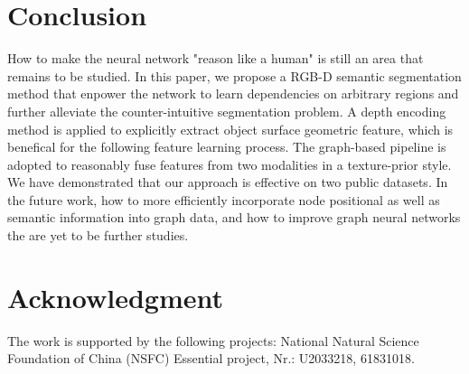 \documentclass[journal]{IEEEtran}
\begin{document}
\section{Conclusion}
    How to make the neural network "reason like a human" is still an area that remains to be studied. In this paper, we propose a RGB-D semantic segmentation method that enpower the network to learn dependencies on arbitrary regions and further alleviate the counter-intuitive segmentation problem. A depth encoding method is applied to explicitly extract object surface geometric feature, which is benefical for the following feature learning process. The graph-based pipeline is adopted to reasonably fuse features from two modalities in a texture-prior style. We have demonstrated that our approach is effective on two public datasets. In the future work, how to more efficiently incorporate node positional as well as semantic information into graph data, and how to improve graph neural networks the are yet to be further studies.

\section*{Acknowledgment}
    The work is supported by the following projects: National Natural Science Foundation of China (NSFC) Essential project, Nr.: U2033218, 61831018.
 

% 


\end{document}
